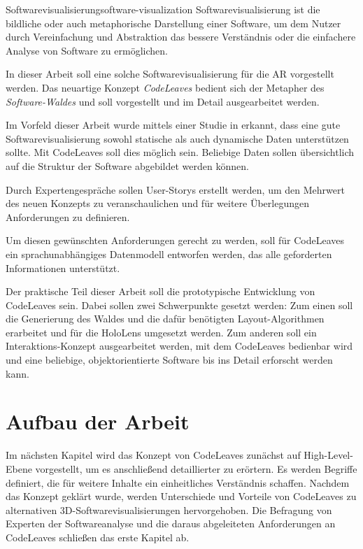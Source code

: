 \begin{defbox}{Softwarevisualisierung}{software-visualization}
Softwarevisualisierung ist die bildliche oder auch metaphorische Darstellung einer Software, um dem Nutzer durch Vereinfachung und Abstraktion das bessere Verständnis oder die einfachere Analyse von Software zu ermöglichen.
\end{defbox}

In dieser Arbeit soll eine solche Softwarevisualisierung für die AR vorgestellt werden. Das neuartige Konzept \emph{CodeLeaves} bedient sich der Metapher des \textit{Software-Waldes} und soll vorgestellt und im Detail ausgearbeitet werden.

Im Vorfeld dieser Arbeit wurde mittels einer Studie in \cite{puetz2017softwarevisualisierung} erkannt, dass eine gute Softwarevisualisierung sowohl statische als auch dynamische Daten unterstützen sollte. Mit CodeLeaves soll dies möglich sein. Beliebige Daten sollen übersichtlich auf die Struktur der Software abgebildet werden können.

Durch Expertengespräche sollen User-Storys erstellt werden, um den Mehrwert des neuen Konzepts zu veranschaulichen und für weitere Überlegungen Anforderungen zu definieren.

Um diesen gewünschten Anforderungen gerecht zu werden, soll für CodeLeaves ein sprachunabhängiges Datenmodell entworfen werden, das alle geforderten Informationen unterstützt.

Der praktische Teil dieser Arbeit soll die prototypische Entwicklung von CodeLeaves sein. Dabei sollen zwei Schwerpunkte gesetzt werden: Zum einen soll die Generierung des Waldes und die dafür benötigten Layout-Algorithmen erarbeitet und für die HoloLens umgesetzt werden. Zum anderen soll ein Interaktions-Konzept ausgearbeitet werden, mit dem CodeLeaves bedienbar wird und eine beliebige, objektorientierte Software bis ins Detail erforscht werden kann.

\section{Aufbau der Arbeit}
Im nächsten Kapitel wird das Konzept von CodeLeaves zunächst auf High-Level-Ebene vorgestellt, um es anschließend detaillierter zu erörtern. Es werden Begriffe definiert, die für weitere Inhalte ein einheitliches Verständnis schaffen. Nachdem das Konzept geklärt wurde, werden Unterschiede und Vorteile von CodeLeaves zu alternativen 3D-Softwarevisualisierungen hervorgehoben. Die Befragung von Experten der Softwareanalyse und die daraus abgeleiteten Anforderungen an CodeLeaves schließen das erste Kapitel ab.

